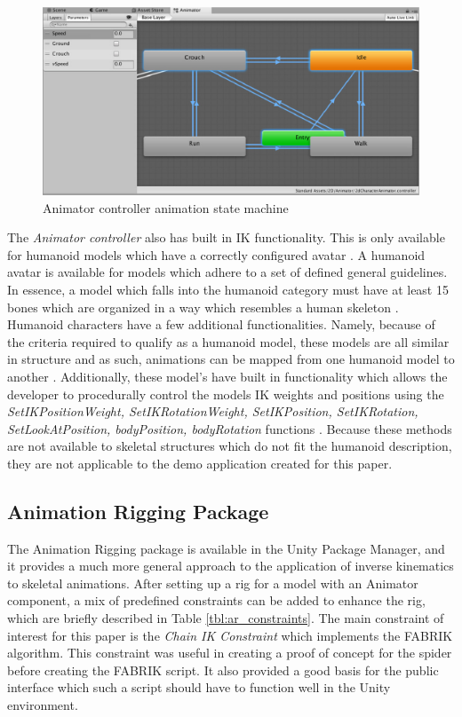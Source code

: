 \begin{figure}
    \centering
    \includegraphics[width=\textwidth]{grafika/animator_controller.eps}
    \caption{Animator controller animation state machine \cite{unity_animator}}
    \label{fig:anim_state}
\end{figure}

The \textit{Animator controller} also has built in IK functionality. This is only
available for humanoid models which have a correctly configured avatar
\cite{unity_ik}. A humanoid avatar is available for models which adhere to a set
of defined general guidelines. In essence, a model which falls into the humanoid
category must have at least 15 bones which are organized in a way which
resembles a human skeleton \cite{unity_humanoid_import}. Humanoid characters
have a few additional functionalities. Namely, because of the criteria required
to qualify as a humanoid model, these models are all similar in structure and as
such, animations can be mapped from one humanoid model to another
\cite{unity_humanoid_avatars}. Additionally, these model's have built in
functionality which allows the developer to procedurally control the models IK
weights and positions using the \textit{SetIKPositionWeight,
SetIKRotationWeight, SetIKPosition, SetIKRotation, SetLookAtPosition,
bodyPosition, bodyRotation} functions \cite{unity_ik, unity_humanoid_avatars}.
Because these methods are not available to skeletal structures which do not fit
the humanoid description, they are not applicable to the demo application
created for this paper.

\subsection{Animation Rigging Package}

The Animation Rigging package is available in the Unity Package Manager, and it
provides a much more general approach to the application of inverse kinematics
to skeletal animations. After setting up a rig for a model with an Animator
component, a mix of predefined constraints can be added to enhance the rig,
which are briefly described in Table \ref{tbl:ar_constraints}. The main
constraint of interest for this paper is the \textit{Chain IK Constraint} which
implements the FABRIK algorithm. This constraint was useful in creating a proof
of concept for the spider before creating the FABRIK script. It also provided
a good basis for the public interface which such a script should have to
function well in the Unity environment.

